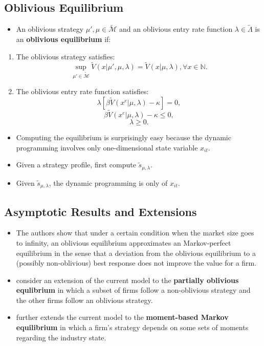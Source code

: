 \documentclass[]{book}
\providecommand{\tightlist}{%
  \setlength{\itemsep}{0pt}\setlength{\parskip}{0pt}}
\begin{document}
\subsection{Oblivious Equilibrium}\label{oblivious-equilibrium}

\begin{itemize}
\tightlist
\item
  An oblivious strategy \(\mu', \mu \in \widetilde{\mathcal{M}}\) and an
  oblivious entry rate function \(\lambda \in \widetilde{\Lambda}\) is
  an \textbf{oblivious equilibrium} if:
\end{itemize}

\begin{enumerate}
\def\labelenumi{\arabic{enumi}.}
\tightlist
\item
  The oblivious strategy satisfies: \[
  \sup_{\mu'  \in \widetilde{\mathcal{M}}} \widetilde{V}(x|\mu', \mu, \lambda) = \widetilde{V}(x|\mu, \lambda), \forall x \in \mathbb{N}.
  \]
\item
  The oblivious entry rate function satisfies: \[
  \lambda [\beta \widetilde{V}(x^e|\mu, \lambda) - \kappa] = 0,
  \] \[
  \beta \widetilde{V}(x^e|\mu, \lambda) - \kappa \le 0,
  \] \[
  \lambda \ge 0.
  \]
\end{enumerate}

\begin{itemize}
\tightlist
\item
  Computing the equilibrium is surprisingly easy because the dynamic
  programming involves only one-dimensional state variable \(x_{it}\).
\item
  Given a strategy profile, first compute \(\tilde{s}_{\mu, \lambda}\).
\item
  Given \(\tilde{s}_{\mu, \lambda}\), the dynamic programming is only of
  \(x_{it}\).
\end{itemize}

\subsection{Asymptotic Results and
Extensions}\label{asymptotic-results-and-extensions}

\begin{itemize}
\tightlist
\item
  The authors show that under a certain condition when the market size
  goes to infinity, an oblivious equilibrium approximates an
  Markov-perfect equilibrium in the sense that a deviation from the
  oblivious equilibrium to a (possibly non-oblivious) best response does
  not improve the value for a firm.
\item
  \citet{Benkard2015} consider an extension of the current model to the
  \textbf{partially oblivious equlibrium} in which a subset of firms
  follow a non-oblivious strategy and the other firms follow an
  oblivious strategy.
\item
  \citet{Ifrach2017} further extends the current model to the
  \textbf{moment-based Markov equilibrium} in which a firm's strategy
  depends on some sets of moments regarding the industry state.
\end{itemize}
\end{document}
